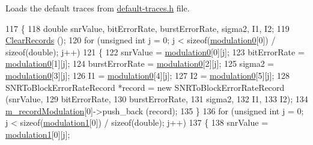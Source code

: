 Loads the default traces from \hyperlink{default-traces_8h}{default-\/traces.\+h} file. 


\begin{DoxyCode}
117 \{
118   \textcolor{keywordtype}{double} snrValue, bitErrorRate, burstErrorRate, sigma2, I1, I2;
119   \hyperlink{classns3_1_1SNRToBlockErrorRateManager_a164e69eaafc229e1f98a80175481e101}{ClearRecords} ();
120   \textcolor{keywordflow}{for} (\textcolor{keywordtype}{unsigned} \textcolor{keywordtype}{int} j = 0; j < \textcolor{keyword}{sizeof}(\hyperlink{classns3_1_1SNRToBlockErrorRateManager_ab85f6c8f2604855998ed15c069e62513}{modulation0}[0]) / \textcolor{keyword}{sizeof}(\textcolor{keywordtype}{double}); j++)
121     \{
122       snrValue = \hyperlink{classns3_1_1SNRToBlockErrorRateManager_ab85f6c8f2604855998ed15c069e62513}{modulation0}[0][j];
123       bitErrorRate = \hyperlink{classns3_1_1SNRToBlockErrorRateManager_ab85f6c8f2604855998ed15c069e62513}{modulation0}[1][j];
124       burstErrorRate = \hyperlink{classns3_1_1SNRToBlockErrorRateManager_ab85f6c8f2604855998ed15c069e62513}{modulation0}[2][j];
125       sigma2 = \hyperlink{classns3_1_1SNRToBlockErrorRateManager_ab85f6c8f2604855998ed15c069e62513}{modulation0}[3][j];
126       I1 = \hyperlink{classns3_1_1SNRToBlockErrorRateManager_ab85f6c8f2604855998ed15c069e62513}{modulation0}[4][j];
127       I2 = \hyperlink{classns3_1_1SNRToBlockErrorRateManager_ab85f6c8f2604855998ed15c069e62513}{modulation0}[5][j];
128       SNRToBlockErrorRateRecord *record = \textcolor{keyword}{new} SNRToBlockErrorRateRecord (snrValue,
129                                                                          bitErrorRate,
130                                                                          burstErrorRate,
131                                                                          sigma2,
132                                                                          I1,
133                                                                          I2);
134       \hyperlink{classns3_1_1SNRToBlockErrorRateManager_af74c812f3b0a25252f2897aadea6898e}{m\_recordModulation}[0]->push\_back (record);
135     \}
136   \textcolor{keywordflow}{for} (\textcolor{keywordtype}{unsigned} \textcolor{keywordtype}{int} j = 0; j < \textcolor{keyword}{sizeof}(\hyperlink{classns3_1_1SNRToBlockErrorRateManager_a748cc86d24982cdcab55497c0813d249}{modulation1}[0]) / \textcolor{keyword}{sizeof}(\textcolor{keywordtype}{double}); j++)
137     \{
138       snrValue = \hyperlink{classns3_1_1SNRToBlockErrorRateManager_a748cc86d24982cdcab55497c0813d249}{modulation1}[0][j];

\end{DoxyCode}
